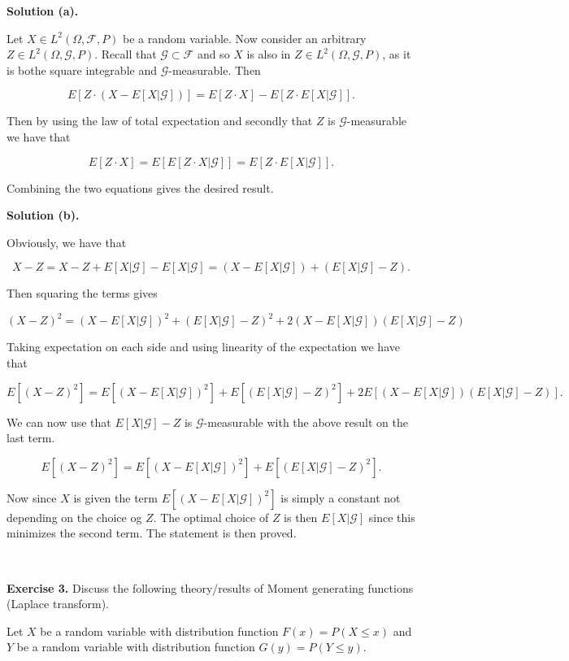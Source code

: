 \documentclass[
]{article}
\begin{document}
\textbf{Solution (a).}

Let \(X\in L^2(\Omega,\mathcal{F},P)\) be a random variable. Now
consider an arbitrary \(Z\in L^2(\Omega,\mathcal{G},P)\). Recall that
\(\mathcal{G}\subset \mathcal{F}\) and so \(X\) is also in
\(Z\in L^2(\Omega,\mathcal{G},P)\), as it is bothe square integrable and
\(\mathcal{G}\)-measurable. Then

\[E\left[Z\cdot(X-E[X\vert\mathcal{G}])\right]=E\left[Z\cdot X\right]-E\left[Z\cdot E[X\vert\mathcal{G}]\right].\]

Then by using the law of total expectation and secondly that \(Z\) is
\(\mathcal{G}\)-measurable we have that

\[E\left[Z\cdot X\right]=E\left[E[Z\cdot X\vert\mathcal{G}]\right]=E\left[Z\cdot E[ X\vert\mathcal{G}]\right].\]

Combining the two equations gives the desired result.

\textbf{Solution (b).}

Obviously, we have that

\[X-Z=X-Z+E[X\vert\mathcal{G}]-E[X\vert\mathcal{G}]=(X-E[X\vert\mathcal{G}])+(E[X\vert\mathcal{G}]-Z).\]

Then squaring the terms gives

\[(X-Z)^2=(X-E[X\vert\mathcal{G}])^2+(E[X\vert\mathcal{G}]-Z)^2+2(X-E[X\vert\mathcal{G}])(E[X\vert\mathcal{G}]-Z)\]

Taking expectation on each side and using linearity of the expectation
we have that

\[E[(X-Z)^2]=E\left[(X-E[X\vert\mathcal{G}])^2\right]+E\left[(E[X\vert\mathcal{G}]-Z)^2\right]+2E\left[(X-E[X\vert\mathcal{G}])(E[X\vert\mathcal{G}]-Z)\right].\]

We can now use that \(E[X\vert\mathcal{G}]-Z\) is
\(\mathcal{G}\)-measurable with the above result on the last term.

\[E[(X-Z)^2]=E\left[(X-E[X\vert\mathcal{G}])^2\right]+E\left[(E[X\vert\mathcal{G}]-Z)^2\right].\]

Now since \(X\) is given the term
\(E\left[(X-E[X\vert\mathcal{G}])^2\right]\) is simply a constant not
depending on the choice og \(Z\). The optimal choice of \(Z\) is then
\(E[X\vert\mathcal{G}]\) since this minimizes the second term. The
statement is then proved.

~

\textbf{Exercise 3.} Discuss the following theory/results of Moment
generating functions (Laplace transform).

Let \(X\) be a random variable with distribution function
\(F(x)=P(X\le x)\) and \(Y\) be a random variable with distribution
function \(G(y)=P(Y\le y)\).
\end{document}
